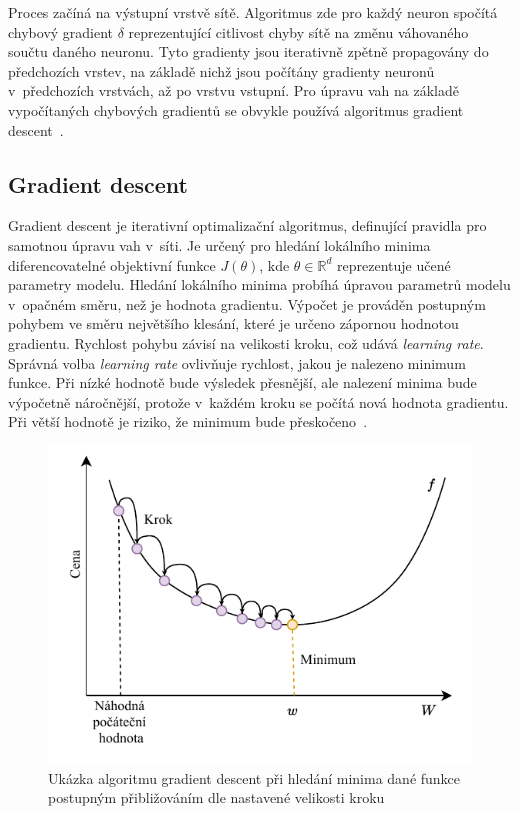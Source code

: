Proces začíná na výstupní vrstvě sítě. Algoritmus zde pro každý neuron spočítá chybový gradient $\delta$ reprezentující citlivost chyby sítě na změnu váhovaného součtu daného neuronu. Tyto gradienty jsou iterativně zpětně propagovány do předchozích vrstev, na základě nichž jsou počítány gradienty neuronů v~předchozích vrstvách, až po vrstvu vstupní. Pro úpravu vah na základě vypočítaných chybových gradientů se obvykle používá algoritmus gradient descent~\cite{mitdeeplearning_small}.




\subsection*{Gradient descent}
Gradient descent je iterativní optimalizační algoritmus, definující pravidla pro samotnou úpravu vah v~síti. Je určený pro hledání lokálního minima diferencovatelné objektivní funkce $J(\theta)$, kde $\theta \in \mathbb{R}^d$ reprezentuje učené parametry modelu. Hledání lokálního minima probíhá úpravou parametrů modelu v~opačném směru, než je hodnota gradientu. Výpočet je prováděn postupným pohybem ve směru největšího klesání, které je určeno zápornou hodnotou gradientu. Rychlost pohybu závisí na velikosti kroku, což udává \textit{learning rate}. Správná volba \textit{learning rate} ovlivňuje rychlost, jakou je nalezeno minimum funkce. Při nízké hodnotě bude výsledek přesnější, ale nalezení minima bude výpočetně náročnější, protože v~každém kroku se počítá nová hodnota gradientu. Při větší hodnotě je riziko, že minimum bude přeskočeno~\cite{ruder2016overview}.
\begin{figure}[H]
    \centering
    \includegraphics[scale=1.0]{obrazky-figures/gradientdescent.pdf}
    \caption{\label{fig:gradientdescent}Ukázka algoritmu gradient descent při hledání minima dané funkce postupným přibližováním dle nastavené velikosti kroku}
\end{figure}

